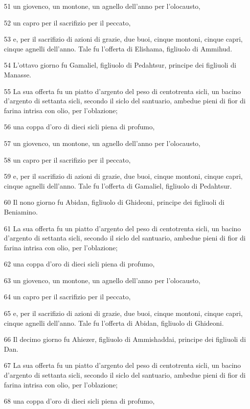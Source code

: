 \par 51 un giovenco, un montone, un agnello dell'anno per l'olocausto,
\par 52 un capro per il sacrifizio per il peccato,
\par 53 e, per il sacrifizio di azioni di grazie, due buoi, cinque montoni, cinque capri, cinque agnelli dell'anno. Tale fu l'offerta di Elishama, figliuolo di Ammihud.
\par 54 L'ottavo giorno fu Gamaliel, figliuolo di Pedahtsur, principe dei figliuoli di Manasse.
\par 55 La sua offerta fu un piatto d'argento del peso di centotrenta sicli, un bacino d'argento di settanta sicli, secondo il siclo del santuario, ambedue pieni di fior di farina intrisa con olio, per l'oblazione;
\par 56 una coppa d'oro di dieci sicli piena di profumo,
\par 57 un giovenco, un montone, un agnello dell'anno per l'olocausto,
\par 58 un capro per il sacrifizio per il peccato,
\par 59 e, per il sacrifizio di azioni di grazie, due buoi, cinque montoni, cinque capri, cinque agnelli dell'anno. Tale fu l'offerta di Gamaliel, figliuolo di Pedahtsur.
\par 60 Il nono giorno fu Abidan, figliuolo di Ghideoni, principe dei figliuoli di Beniamino.
\par 61 La sua offerta fu un piatto d'argento del peso di centotrenta sicli, un bacino d'argento di settanta sicli, secondo il siclo del santuario, ambedue pieni di fior di farina intrisa con olio, per l'oblazione;
\par 62 una coppa d'oro di dieci sicli piena di profumo,
\par 63 un giovenco, un montone, un agnello dell'anno per l'olocausto,
\par 64 un capro per il sacrifizio per il peccato,
\par 65 e, per il sacrifizio di azioni di grazie, due buoi, cinque montoni, cinque capri, cinque agnelli dell'anno. Tale fu l'offerta di Abidan, figliuolo di Ghideoni.
\par 66 Il decimo giorno fu Ahiezer, figliuolo di Ammishaddai, principe dei figliuoli di Dan.
\par 67 La sua offerta fu un piatto d'argento del peso di centotrenta sicli, un bacino d'argento di settanta sicli, secondo il siclo del santuario, ambedue pieni di fior di farina intrisa con olio, per l'oblazione;
\par 68 una coppa d'oro di dieci sicli piena di profumo,
